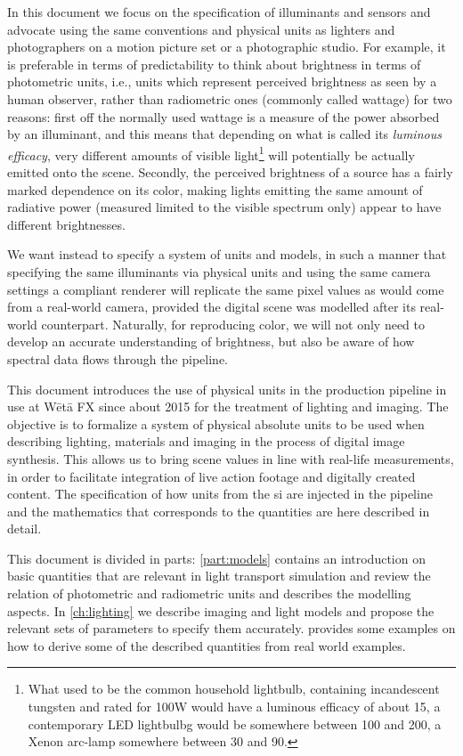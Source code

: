 In this document we focus on the specification of \glspl{illuminant} and
\glspl{sensor} and advocate using the same conventions and physical units as
lighters and photographers on a motion picture set or a photographic studio. 
For example, it is preferable in
terms of predictability to think about brightness in terms of
photometric units, i.e., units which represent perceived brightness as
seen by a human observer, rather than radiometric ones (commonly called wattage)
for two reasons: first off the normally used wattage is a measure of the power 
absorbed by an illuminant, and this means that depending on what is called its 
\textsl{\gls{luminous efficacy}}, very different amounts of visible light\footnote{What 
	used to be the common household lightbulb, containing incandescent tungsten and 
	rated for 100W would have a luminous efficacy of about 15, 
	a contemporary \gls{LED} lightbulbg would be 
	somewhere between 100 and 200, a Xenon arc-lamp somewhere between 30 and 90.} 
will potentially be actually emitted onto the scene. 
Secondly, the perceived brightness of a source has a fairly marked dependence on 
its color, making lights emitting the same amount of radiative power (measured limited
to the visible spectrum only) appear to have different brightnesses. 

We want instead to specify a system of units and models, in such a manner that
specifying the same illuminants via physical units and using the same
camera settings a compliant renderer will replicate the same pixel values as 
would come from a real-world camera, provided the digital scene was modelled 
after its real-world counterpart. 
Naturally, for reproducing color, we will not only need
to develop an accurate understanding of brightness, but also be aware
of how spectral data flows through the \gls{pipeline}.


This document introduces the use of physical units in the
production pipeline in use at W\=et\=a FX since about 2015 for the 
treatment of lighting and imaging.  
The objective is to formalize a system of physical absolute units to be used
when describing lighting, materials and imaging in the
process of digital image synthesis. 
This allows us to bring scene values in line
with real-life measurements, in order to facilitate integration of
live action footage and digitally created content. 
The specification of how units from the \gls{si} are injected in 
the pipeline and the mathematics that corresponds to the quantities 
are here described in detail.

This document is divided in parts: \cref{part:models}
contains an introduction on basic quantities that are relevant in
light transport simulation and review the relation of photometric and
radiometric units and describes the modelling aspects. In 
\cref{ch:lighting} we describe imaging and light models and propose the
relevant sets of parameters to specify them accurately.  
 provides some examples on how to derive some of
the described quantities from real world examples.

